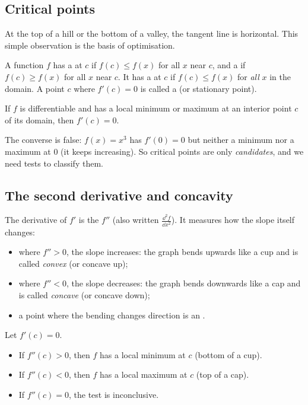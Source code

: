 \subsection{Critical points}

At the top of a hill or the bottom of a valley, the tangent line is
horizontal. This simple observation is the basis of optimisation.

\begin{definition}\label{def:extrema}
A function $f$ has a  at $c$ if $f(c) \le f(x)$ for all $x$
near $c$, and a  if $f(c) \ge f(x)$ for all $x$ near $c$. It
has a  at $c$ if $f(c) \le f(x)$ for \emph{all} $x$ in the
domain. A point $c$ where $f'(c) = 0$ is called a 
(or stationary point).
\end{definition}

\begin{theorem}\label{thm:fermat}
If $f$ is differentiable and has a local minimum or maximum at an interior
point $c$ of its domain, then $f'(c) = 0$.
\end{theorem}

The converse is false: $f(x) = x^3$ has $f'(0) = 0$ but neither a minimum nor
a maximum at $0$ (it keeps increasing). So critical points are only
\emph{candidates}, and we need tests to classify them.

\subsection{The second derivative and concavity}

The derivative of $f'$ is the  $f''$ (also written
$\frac{\dd^2 f}{\dd x^2}$). It measures how the slope itself changes:
\begin{itemize}
  \item where $f'' > 0$, the slope increases: the graph bends upwards like a
    cup and is called \emph{convex} (or concave up);
  \item where $f'' < 0$, the slope decreases: the graph bends downwards like a
    cap and is called \emph{concave} (or concave down);
  \item a point where the bending changes direction is an
    .
\end{itemize}

\begin{theorem}\label{thm:second-derivative-test}
Let $f'(c) = 0$.
\begin{itemize}
  \item If $f''(c) > 0$, then $f$ has a local minimum at $c$ (bottom of a cup).
  \item If $f''(c) < 0$, then $f$ has a local maximum at $c$ (top of a cap).
  \item If $f''(c) = 0$, the test is inconclusive.
\end{itemize}
\end{theorem}

